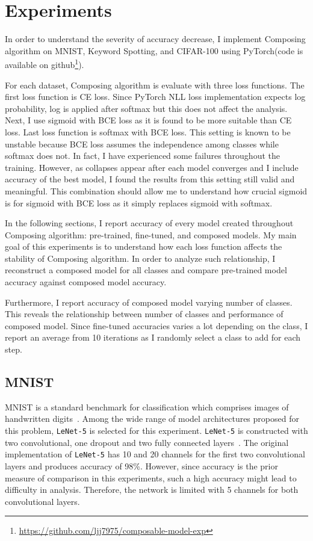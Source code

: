 \documentclass{article}
\begin{document}
\section{Experiments}

In order to understand the severity of accuracy decrease, I implement Composing algorithm on MNIST, Keyword Spotting, and CIFAR-100 using PyTorch(code is available on github\footnote{\url{https://github.com/ljj7975/composable-model-exp}}).

For each dataset, Composing algorithm is evaluate with three loss functions. The first loss function is CE loss. Since PyTorch NLL loss implementation expects log probability, log is applied after softmax but this does not affect the analysis. Next, I use sigmoid with BCE loss as it is found to be more suitable than CE loss. Last loss function is softmax with BCE loss. This setting is known to be unstable because BCE loss assumes the independence among classes while softmax does not. In fact, I have experienced some failures throughout the training. However, as collapses appear after each model converges and I include accuracy of the best model, I found the results from this setting still valid and meaningful. This combination should allow me to understand how crucial sigmoid is for sigmoid with BCE loss as it simply replaces sigmoid with softmax.

In the following sections, I report accuracy of every model created throughout Composing algorithm: pre-trained, fine-tuned, and composed models. My main goal of this experiments is to understand how each loss function affects the stability of Composing algorithm. In order to analyze such relationship, I reconstruct a composed model for all classes and compare pre-trained model accuracy against composed model accuracy.

Furthermore, I report accuracy of composed model varying number of classes. This reveals the relationship between number of classes and performance of composed model. Since fine-tuned accuracies varies a lot depending on the class, I report an average from 10 iterations as I randomly select a class to add for each step.

\subsection{MNIST}

MNIST is a standard benchmark for classification which comprises images of handwritten digits~\cite{lecun1998gradient}. Among the wide range of model architectures proposed for this problem, \texttt{LeNet-5} is selected for this experiment. \texttt{LeNet-5} is constructed with two convolutional, one dropout and two fully connected layers~\cite{lecun2015lenet}. The original implementation of \texttt{LeNet-5} has 10 and 20 channels for the first two convolutional layers and produces accuracy of 98\%. However, since accuracy is the prior measure of comparison in this experiments, such a high accuracy might lead to difficulty in analysis. Therefore, the network is limited with 5 channels for both convolutional layers.
\end{document}
